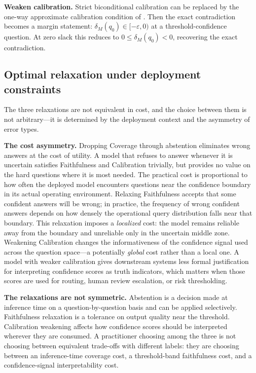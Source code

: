 \documentclass[10pt]{article}
\begin{document}
\textbf{Weaken calibration.} Strict biconditional calibration can be
replaced by the one-way approximate calibration condition of .
Then the exact contradiction becomes a margin statement:
$\delta_M(q_0)\in[-\varepsilon,0)$ at a threshold-confidence question. At
zero slack this reduces to $0\leq\delta_M(q_0)<0$, recovering the exact
contradiction.

\subsection{Optimal relaxation under deployment constraints}
\label{sec:optimal-relaxation}

The three relaxations are not equivalent in cost, and the choice between
them is not arbitrary---it is determined by the deployment context and the
asymmetry of error types.

\textbf{The cost asymmetry.}
Dropping Coverage through abstention eliminates wrong answers at the cost
of utility. A model that refuses to answer whenever it is uncertain
satisfies Faithfulness and Calibration trivially, but provides no value on
the hard questions where it is most needed. The practical cost is
proportional to how often the deployed model encounters questions near the
confidence boundary in its actual operating environment. Relaxing
Faithfulness accepts that some confident answers will be wrong; in
practice, the frequency of wrong confident answers depends on how densely
the operational query distribution falls near that boundary. This
relaxation imposes a \emph{localized} cost: the model remains reliable away
from the boundary and unreliable only in the uncertain middle zone.
Weakening Calibration changes the informativeness of the confidence signal
used across the question space---a potentially \emph{global} cost rather than
a local one. A model with weaker calibration gives downstream systems less
formal justification for interpreting confidence scores as truth indicators,
which matters when those scores are used for routing, human review escalation,
or risk thresholding.

\textbf{The relaxations are not symmetric.}
Abstention is a decision made at inference time on a question-by-question
basis and can be applied selectively. Faithfulness relaxation is a tolerance
on output quality near the threshold. Calibration weakening affects how
confidence scores should be interpreted wherever they are consumed. A
practitioner choosing among the three is not choosing between equivalent
trade-offs with different labels: they are choosing between an inference-time
coverage cost, a threshold-band faithfulness cost, and a confidence-signal
interpretability cost.
\end{document}
